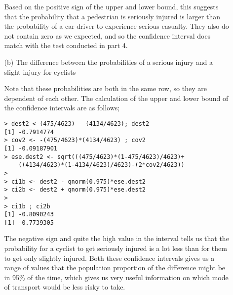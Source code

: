 \documentclass[11pt,a4]{article}
\begin{document}
\begin{enumerate}
\begin{itemize}
Based on the positive sign of the upper and lower bound, this suggests that the probability that a pedestrian is seriously injured is larger than the probability of a car driver to experience serious casualty. They also do not contain zero as we expected, and so the confidence interval does match with the test conducted in part 4. 

\item [(b)]
    The difference between the probabilities of a serious injury and a slight injury for cyclists
    
\bigskip

Note that these probabilities are both in the same row, so they are dependent of each other. The calculation of the upper and lower bound of the confidence intervals are as follows;
    
\begin{verbatim}
> dest2 <-(475/4623) - (4134/4623); dest2
[1] -0.7914774
> cov2 <- -(475/4623)*(4134/4623) ; cov2
[1] -0.09187901
> ese.dest2 <- sqrt(((475/4623)*(1-475/4623)/4623)+
    ((4134/4623)*(1-4134/4623)/4623)-(2*cov2/4623))
> 
> ci1b <- dest2 - qnorm(0.975)*ese.dest2
> ci2b <- dest2 + qnorm(0.975)*ese.dest2
> 
> ci1b ; ci2b
[1] -0.8090243
[1] -0.7739305
\end{verbatim}	
    
The negative sign and quite the high value in the interval tells us that the probability for a cyclist to get seriously injured is a lot less than for them to get only slightly injured. Both these confidence intervals gives us a range of values that the population proportion of the difference might be in 95\% of the time, which gives us very useful information on which mode of transport would be less risky to take.
    
\end{itemize}










\end{enumerate}	
\end{document}
